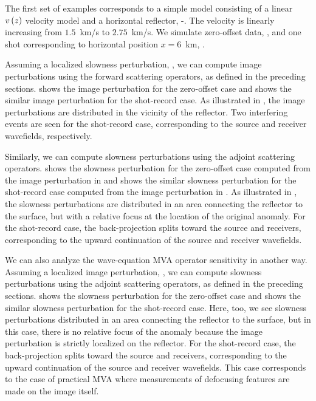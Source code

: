 The first set of examples corresponds to a simple model consisting of
a linear $v\left ( z \right)$ velocity model and a horizontal reflector,
-. The velocity is linearly
increasing from $1.5$~km/s to $2.75$~km/s. We simulate zero-offset
data, , and one shot corresponding to horizontal
position $x=6$~km, .

Assuming a localized slowness perturbation, , we
can compute image perturbations using the forward scattering
operators, as defined in the preceding sections. 
shows the image perturbation for the zero-offset case and
 shows the similar image perturbation for the
shot-record case. As illustrated in , the image
perturbations are distributed in the vicinity of the reflector. Two
interfering events are seen for the shot-record case, corresponding to
the source and receiver wavefields, respectively.

Similarly, we can compute slowness perturbations using the adjoint
scattering operators.  shows the slowness
perturbation for the zero-offset case computed from the image
perturbation in  and  shows
the similar slowness perturbation for the shot-record case computed
from the image perturbation in .  As illustrated
in , the slowness perturbations are distributed in an
area connecting the reflector to the surface, but with a relative
focus at the location of the original anomaly. For the shot-record
case, the back-projection splits toward the source and receivers,
corresponding to the upward continuation of the source and receiver
wavefields.

We can also analyze the wave-equation MVA operator sensitivity in
another way. Assuming a localized image perturbation,
, we can compute slowness perturbations using the
adjoint scattering operators, as defined in the preceding
sections.  shows the slowness perturbation for
the zero-offset case and  shows the similar
slowness perturbation for the shot-record case. Here, too, we see
slowness perturbations distributed in an area connecting the reflector
to the surface, but in this case, there is no relative focus of the
anomaly because the image perturbation is strictly localized on the
reflector. For the shot-record case, the back-projection splits toward
the source and receivers, corresponding to the upward continuation of
the source and receiver wavefields. This case corresponds to the case
of practical MVA where measurements of defocusing features are made on
the image itself.


